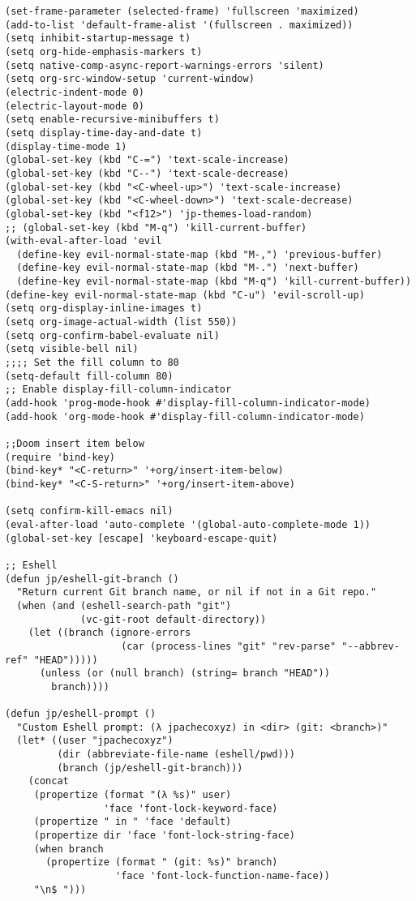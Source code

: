 \documentclass[11pt]{article}
\begin{document}
\begin{verbatim}
(set-frame-parameter (selected-frame) 'fullscreen 'maximized)
(add-to-list 'default-frame-alist '(fullscreen . maximized))
(setq inhibit-startup-message t)
(setq org-hide-emphasis-markers t)
(setq native-comp-async-report-warnings-errors 'silent)
(setq org-src-window-setup 'current-window)
(electric-indent-mode 0)
(electric-layout-mode 0)
(setq enable-recursive-minibuffers t)
(setq display-time-day-and-date t)
(display-time-mode 1)
(global-set-key (kbd "C-=") 'text-scale-increase)
(global-set-key (kbd "C--") 'text-scale-decrease)
(global-set-key (kbd "<C-wheel-up>") 'text-scale-increase)
(global-set-key (kbd "<C-wheel-down>") 'text-scale-decrease)
(global-set-key (kbd "<f12>") 'jp-themes-load-random)
;; (global-set-key (kbd "M-q") 'kill-current-buffer)
(with-eval-after-load 'evil
  (define-key evil-normal-state-map (kbd "M-,") 'previous-buffer)
  (define-key evil-normal-state-map (kbd "M-.") 'next-buffer)
  (define-key evil-normal-state-map (kbd "M-q") 'kill-current-buffer))
(define-key evil-normal-state-map (kbd "C-u") 'evil-scroll-up)
(setq org-display-inline-images t)
(setq org-image-actual-width (list 550))
(setq org-confirm-babel-evaluate nil)
(setq visible-bell nil)
;;;; Set the fill column to 80
(setq-default fill-column 80)
;; Enable display-fill-column-indicator
(add-hook 'prog-mode-hook #'display-fill-column-indicator-mode) 
(add-hook 'org-mode-hook #'display-fill-column-indicator-mode)

;;Doom insert item below
(require 'bind-key)
(bind-key* "<C-return>" '+org/insert-item-below)
(bind-key* "<C-S-return>" '+org/insert-item-above)

(setq confirm-kill-emacs nil)
(eval-after-load 'auto-complete '(global-auto-complete-mode 1))
(global-set-key [escape] 'keyboard-escape-quit)

;; Eshell
(defun jp/eshell-git-branch ()
  "Return current Git branch name, or nil if not in a Git repo."
  (when (and (eshell-search-path "git")
             (vc-git-root default-directory))
    (let ((branch (ignore-errors
                    (car (process-lines "git" "rev-parse" "--abbrev-ref" "HEAD")))))
      (unless (or (null branch) (string= branch "HEAD"))
        branch))))

(defun jp/eshell-prompt ()
  "Custom Eshell prompt: (λ jpachecoxyz) in <dir> (git: <branch>)"
  (let* ((user "jpachecoxyz")
         (dir (abbreviate-file-name (eshell/pwd)))
         (branch (jp/eshell-git-branch)))
    (concat
     (propertize (format "(λ %s)" user)
                 'face 'font-lock-keyword-face)
     (propertize " in " 'face 'default)
     (propertize dir 'face 'font-lock-string-face)
     (when branch
       (propertize (format " (git: %s)" branch)
                   'face 'font-lock-function-name-face))
     "\n$ ")))


\end{verbatim}
\end{document}
